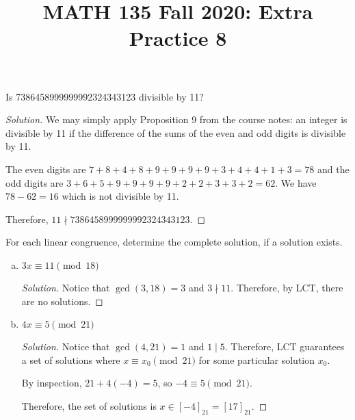 \documentclass{agony}
\title{MATH 135 Fall 2020: Extra Practice 8}
\begin{document}
\thispagestyle{firstpage}

\textbf{\thetitle}


\question Is 7386458999999992324343123 divisible by 11?
\begin{proof}[Solution]
  We may simply apply Proposition 9 from the course notes: an integer is divisible by 11
  if the difference of the sums of the even and odd digits is divisible by 11.

  The even digits are $7+8+4+8+9+9+9+9+3+4+4+1+3 = 78$
  and the odd digits are $3+6+5+9+9+9+9+2+2+3+3+2 = 62$.
  We have $78 - 62 = 16$ which is not divisible by 11.

  Therefore, $11 \nmid 7386458999999992324343123$.
\end{proof}


\question For each linear congruence, determine the complete solution, if a solution exists.
\begin{enumerate}[(a)]
  \item $3x \equiv 11 \pmod{18}$
        \begin{proof}[Solution]
          Notice that $\gcd(3,18)=3$ and $3 \nmid 11$.
          Therefore, by LCT, there are no solutions.
        \end{proof}
  \item $4x \equiv 5 \pmod{21}$
        \begin{proof}[Solution]
          Notice that $\gcd(4,21)=1$ and $1 \mid 5$.
          Therefore, LCT guarantees a set of solutions where $x \equiv x_0 \pmod{21}$
          for some particular solution $x_0$.

          By inspection, $21+4(-4) = 5$, so $-4 \equiv 5 \pmod{21}$.

          Therefore, the set of solutions is $x \in [-4]_{21} = [17]_{21}$.
        \end{proof}
\end{enumerate}
\end{document}
